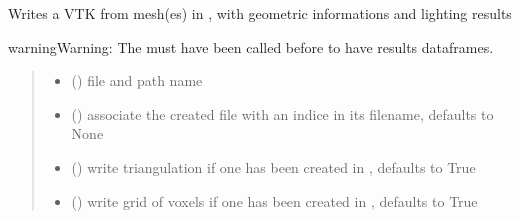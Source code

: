 \documentclass[letterpaper,10pt,english]{sphinxmanual}
\begin{document}
\begin{fulllineitems}

\begin{fulllineitems}
\label{\detokenize{reference:LVM.LightVegeManager.VTK_light}}
\pysigstartsignatures
{}
\pysigstopsignatures
\sphinxAtStartPar
Writes a VTK from mesh(es) in , with geometric informations and lighting results

\begin{sphinxadmonition}{warning}{Warning:}
\sphinxAtStartPar
The {\hyperref[\detokenize{reference:LVM.LightVegeManager.run}]{}} must have been called before to have results dataframes.
\end{sphinxadmonition}
\begin{quote}\begin{description}
\begin{itemize}
\item {} 
\sphinxAtStartPar
{} () \textendash{} file and path name

\item {} 
\sphinxAtStartPar
{} (\sphinxstyleliteralemphasis{\sphinxupquote{, }}) \textendash{} associate the created file with an indice in its filename, defaults to None

\item {} 
\sphinxAtStartPar
{} (\sphinxstyleliteralemphasis{\sphinxupquote{, }}) \textendash{} write triangulation if one has been created in {\hyperref[\detokenize{reference:LVM.LightVegeManager.build}]{}}, defaults to True

\item {} 
\sphinxAtStartPar
{} (\sphinxstyleliteralemphasis{\sphinxupquote{, }}) \textendash{} write grid of voxels if one has been created in {\hyperref[\detokenize{reference:LVM.LightVegeManager.build}]{}}, defaults to True


\end{itemize}
\end{description}
\end{quote}
\end{fulllineitems}
\end{fulllineitems}
\end{document}
